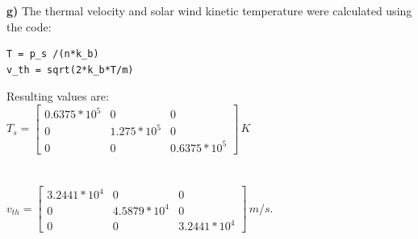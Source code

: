 \documentclass{article}
\begin{document}
\textbf{g)} The thermal velocity and solar wind kinetic temperature were calculated using the code:
\begin{lstlisting}
T = p_s /(n*k_b)
v_th = sqrt(2*k_b*T/m)
\end{lstlisting}
Resulting values are:\\
$T_s=\begin{bmatrix} 0.6375*10^5 & 0 & 0 \\ 0 & 1.275*10^5 & 0 \\ 0 & 0 & 0.6375*10^5 \end{bmatrix}\,K$\\
\\
\hspace{0.5cm}
\\
$v_{th} = \begin{bmatrix} 3.2441*10^4 & 0 & 0 \\ 0 & 4.5879*10^4 & 0 \\ 0 & 0 & 3.2441*10^4 \end{bmatrix}\,m/s$.\\
\end{document}
